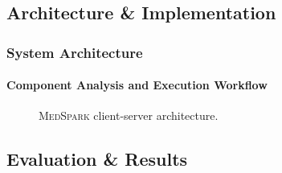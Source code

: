\documentclass[10pt,    %
    english,            %
    xcolor=table,       %
    envcountsect,        %
    aspectratio=169     %
]{beamer}
\newcommand{\projName}{\textsc{MedSpark}\xspace}
\begin{document}
\begin{frame}

\end{frame}

\subsection{Architecture \& Implementation}

\begin{frame}
    \frametitle{System Architecture}
    \framesubtitle{Component Analysis and Execution Workflow}

    \begin{figure}[H]
        \centering
        \resizebox{0.9\linewidth}{!}{}
        \caption{\projName client-server architecture.}
        \label{fig:system-architecture}
    \end{figure}

\end{frame}

\subsection{Evaluation \& Results}
\end{document}
